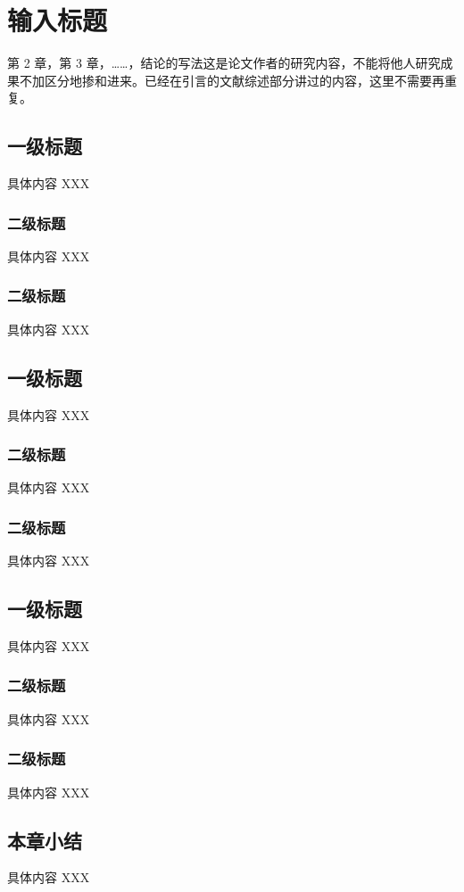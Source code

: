 \chapter{输入标题}

第 2 章，第 3 章，……，结论的写法这是论文作者的研究内容，不能将他人研究成果不加区分地掺和进来。已经在引言的文献综述部分讲过的内容，这里不需要再重复。

\section{一级标题}

具体内容 XXX

\subsection{二级标题}

具体内容 XXX

\subsection{二级标题}

具体内容 XXX

\section{一级标题}

具体内容 XXX

\subsection{二级标题}

具体内容 XXX

\subsection{二级标题}

具体内容 XXX

\section{一级标题}

具体内容 XXX

\subsection{二级标题}

具体内容 XXX

\subsection{二级标题}

具体内容 XXX

\section{本章小结}
具体内容 XXX


